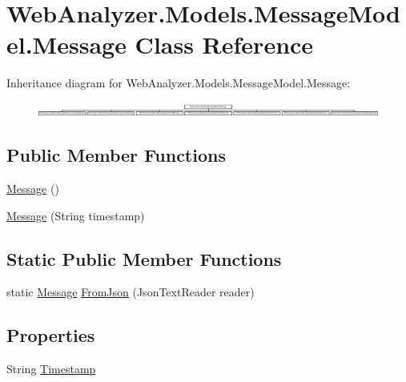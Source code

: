 \hypertarget{class_web_analyzer_1_1_models_1_1_message_model_1_1_message}{}\section{Web\+Analyzer.\+Models.\+Message\+Model.\+Message Class Reference}
\label{class_web_analyzer_1_1_models_1_1_message_model_1_1_message}
Inheritance diagram for Web\+Analyzer.\+Models.\+Message\+Model.\+Message\+:\begin{figure}[H]
\begin{center}
\leavevmode
\includegraphics[height=0.457143cm]{class_web_analyzer_1_1_models_1_1_message_model_1_1_message}
\end{center}
\end{figure}
\subsection*{Public Member Functions}
\begin{DoxyCompactItemize}
\item 
\hyperlink{class_web_analyzer_1_1_models_1_1_message_model_1_1_message_ad1fc3e795c7af522dbf12792f621abfd}{Message} ()
\item 
\hyperlink{class_web_analyzer_1_1_models_1_1_message_model_1_1_message_af05222ad929359946a4ce5d983bf7b22}{Message} (String timestamp)
\end{DoxyCompactItemize}
\subsection*{Static Public Member Functions}
\begin{DoxyCompactItemize}
\item 
static \hyperlink{class_web_analyzer_1_1_models_1_1_message_model_1_1_message}{Message} \hyperlink{class_web_analyzer_1_1_models_1_1_message_model_1_1_message_addad192b40719813b8b260cbea4b6a39}{From\+Json} (Json\+Text\+Reader reader)
\end{DoxyCompactItemize}
\subsection*{Properties}
\begin{DoxyCompactItemize}
\item 
String \hyperlink{class_web_analyzer_1_1_models_1_1_message_model_1_1_message_a9054d90256bf9ad8de33d975d2a188d3}{Timestamp}
\end{DoxyCompactItemize}
